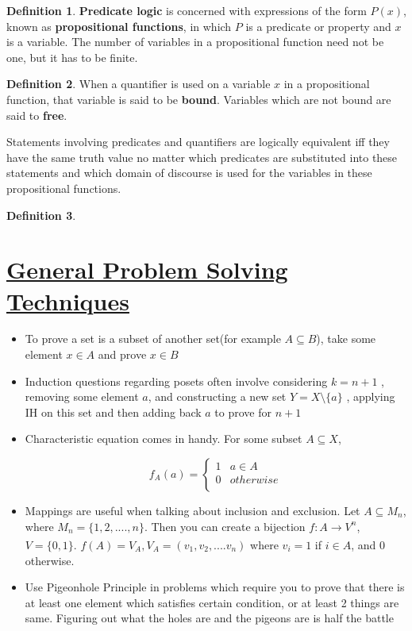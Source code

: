 \documentclass{article}
\theoremstyle{definition}
\newtheorem*{defi}{Definition}
\theoremstyle{definition}
\theoremstyle{named}
\begin{document}
\begin{defi}
    \textbf{Predicate logic} is concerned with
expressions of the form $P(x)$, known as
\textbf{propositional functions}, in which $P$ is a predicate or
property and $x$ is a variable. The number of variables
in a propositional function need not be one, but it
has to be finite.
\end{defi}

\begin{defi}
    When a quantifier is used on a variable
$x$ in a propositional function, that variable is said to
be \textbf{bound}. Variables which are not bound are said to \textbf{free}.
\end{defi}
Statements involving predicates and
quantifiers are logically equivalent iff they have the
same truth value no matter which predicates are
substituted into these statements and which domain
of discourse is used for the variables in these
propositional functions.
\begin{defi}
    
\end{defi}


\section{\underline{General Problem Solving Techniques}}
\begin{itemize}
\item To prove a set is a subset of another set(for example $A \subseteq B$), take some element $x \in A$ and prove $x \in B$ 
\item Induction questions regarding posets often involve considering $k=n+1$ , removing some element $a$, and constructing a new set $Y = X \setminus  \{a\}$ , applying IH on this set and then adding back $a$ to prove for $n+1$
\item  Characteristic equation comes in handy. For some subset $A \subseteq X$, 


\[
f_A(a) =\left\{
\begin{array}{ll}
      1 & a \in  A\\
      0 & otherwise \\
\end{array} 
\right.
        \]

\item Mappings are useful when talking about inclusion and exclusion. Let $A \subseteq M_n$, where $M_n = \{1, 2, ...., n\}$. Then you can create a bijection $f:A \xrightarrow[]{} V^{n}$, $V = \{0, 1\}$. $f(A) = V_A, V_A = (v_1, v_2, .... v_n)$ where $v_i = 1$ if $i \in A$, and 0 otherwise. 

\item Use Pigeonhole Principle in problems which require you to prove that there is at least one element which satisfies certain condition, or at least 2 things are same. Figuring out what the holes are and the pigeons are is half the battle 

\end{itemize}
\end{document}
